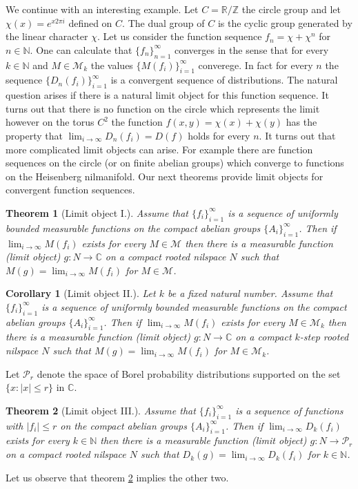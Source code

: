 \documentclass [11pt] {article}
\newtheorem{corollary}{Corollary}[section]
\newtheorem{theorem}{Theorem}
\def\to{\rightarrow}
\begin{document}
We continue with an interesting example.
Let $C=\mathbb{R}/\mathbb{Z}$ the circle group and let $\chi(x)=e^{x2\pi i}$ defined on $C$. The dual group of $C$ is the cyclic group generated by the linear character $\chi$.
Let us consider the function sequence $f_n=\chi+\chi^n$ for $n\in\mathbb{N}$. 
One can calculate that $\{f_n\}_{n=1}^\infty$ converges in the sense that for every  $k\in\mathbb{N}$ and $M\in\mathcal{M}_k$ the values $\{M(f_i)\}_{i=1}^\infty$ converege. In fact for every $n$ the sequence $\{D_n(f_i)\}_{i=1}^\infty$ is a convergent sequence of distributions. 
The natural question arises if there is a natural limit object for this function sequence. It turns out that there is no function on the circle which represents the limit however on the torus $C^2$ the function $f(x,y)=\chi(x)+\chi(y)$ has the property that $\lim_{i\to\infty}D_n(f_i)=D(f)$ holds for every $n$. It turns out that more complicated limit objects can arise. For example there are function sequences on the circle (or on finite abelian groups) which converge to functions on the Heisenberg nilmanifold. 
Our next theorems provide limit objects for convergent function sequences.

\begin{theorem}[Limit object I.]\label{simplim} Assume that $\{f_i\}_{i=1}^\infty$ is a sequence of uniformly bounded measurable functions on the compact abelian groups $\{A_i\}_{i=1}^\infty$. Then if $\lim_{i\to\infty} M(f_i)$ exists for every $M\in\mathcal{M}$ then there is a measurable function (limit object) $g:N\rightarrow\mathbb{C}$ on a compact rooted nilspace $N$ such that $M(g)=\lim_{i\to\infty}M(f_i)$ for $M\in\mathcal{M}$.
\end{theorem}

\begin{corollary}[Limit object II.]\label{simplimcor} Let $k$ be a fixed natural number. Assume that $\{f_i\}_{i=1}^\infty$ is a sequence of uniformly bounded measurable functions on the compact abelian groups $\{A_i\}_{i=1}^\infty$. Then if $\lim_{i\to\infty} M(f_i)$ exists for every $M\in\mathcal{M}_k$ then there is a measurable function (limit object) $g:N\rightarrow\mathbb{C}$ on a compact $k$-step rooted nilspace $N$ such that $M(g)=\lim_{i\to\infty}M(f_i)$ for $M\in\mathcal{M}_k$.
\end{corollary}

Let $\mathcal{P}_r$ denote the space of Borel probability distributions supported on the set $\{x:|x|\leq r\}$ in $\mathbb{C}$.

\begin{theorem}[Limit object III.]\label{genlim} Assume that $\{f_i\}_{i=1}^\infty$ is a sequence of functions with $|f_i|\leq r$ on the compact abelian groups $\{A_i\}_{i=1}^\infty$. Then if $\lim_{i\to\infty} D_k(f_i)$ exists for every $k\in\mathbb{N}$ then there is a measurable function (limit object) $g:N\rightarrow\mathcal{P}_r$ on a compact rooted nilspace $N$ such that $D_k(g)=\lim_{i\to\infty}D_k(f_i)$ for $k\in\mathbb{N}$.
\end{theorem}
Let us observe that theorem \ref{genlim} implies the other two.
\end{document}

